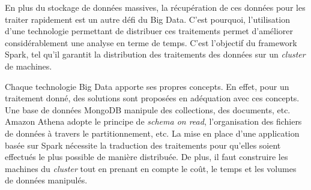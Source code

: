   
  En plus du stockage de données massives, la récupération de ces données pour  les traiter  rapidement est un autre défi du Big Data.
  C'est pourquoi, l'utilisation d'une technologie permettant de distribuer ces traitements permet d'améliorer considérablement une analyse en terme de temps. C'est l'objectif  du framework Spark, tel qu'il garantit la  distribution des traitements des données sur un \textit{cluster} de machines.
  
   Chaque technologie Big Data apporte ses propres concepts. En effet, pour un traitement donné, des solutions sont proposées en adéquation avec ces concepts. Une base de données MongoDB manipule des collections, des documents, etc. Amazon Athena adopte le principe de \textit{schema on read}, l'organisation des fichiers de données à travers le partitionnement, etc. La mise en place d'une application basée sur Spark nécessite  la traduction des traitements pour qu'elles soient effectués le plus possible  de manière distribuée. De plus, il  faut construire les machines du \textit{cluster} tout en prenant en compte le coût, le temps et les volumes de données manipulés.
    
  
  
 





